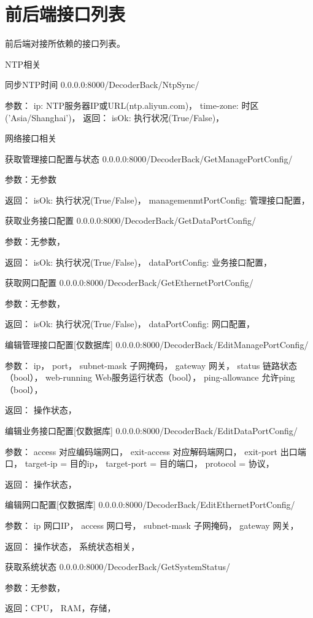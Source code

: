 \chapter{前后端接口列表}
前后端对接所依赖的接口列表。

NTP相关

同步NTP时间
0.0.0.0:8000/DecoderBack/NtpSync/

参数：
ip: NTP服务器IP或URL(ntp.aliyun.com)，
time-zone: 时区('Asia/Shanghai')，
返回：
isOk: 执行状况(True/False)，

网络接口相关

获取管理接口配置与状态
0.0.0.0:8000/DecoderBack/GetManagePortConfig/

参数：无参数

返回：
isOk: 执行状况(True/False)，
managemenmtPortConfig: 管理接口配置，

获取业务接口配置
0.0.0.0:8000/DecoderBack/GetDataPortConfig/

参数：无参数，

返回：
isOk: 执行状况(True/False)，
dataPortConfig: 业务接口配置，

获取网口配置
0.0.0.0:8000/DecoderBack/GetEthernetPortConfig/

参数：无参数，

返回：
isOk: 执行状况(True/False)，
dataPortConfig: 网口配置，

编辑管理接口配置[仅数据库]
0.0.0.0:8000/DecoderBack/EditManagePortConfig/

参数：
ip，
port，
subnet-mask 子网掩码，
gateway 网关，
status 链路状态（bool），
web-running Web服务运行状态（bool），
ping-allowance 允许ping（bool），

返回：
操作状态，

编辑业务接口配置[仅数据库]
0.0.0.0:8000/DecoderBack/EditDataPortConfig/

参数：
access 对应编码端网口，
exit-access 对应解码端网口，
exit-port 出口端口，
target-ip = 目的ip，
target-port = 目的端口，
protocol = 协议，

返回：
操作状态，

编辑网口配置[仅数据库]
0.0.0.0:8000/DecoderBack/EditEthernetPortConfig/

参数：
ip 网口IP，
access 网口号，
subnet-mask 子网掩码，
gateway 网关，

返回：
操作状态，
系统状态相关，

获取系统状态
0.0.0.0:8000/DecoderBack/GetSystemStatus/

参数：无参数，

返回：CPU， RAM，存储，

